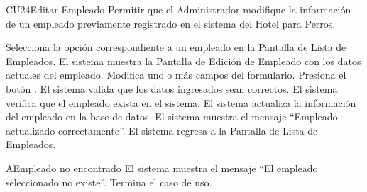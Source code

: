 
\begin{UseCase}{CU24}{Editar Empleado}{
	Permitir que el Administrador modifique la información de un empleado previamente registrado en el sistema del Hotel para Perros.
}
\end{UseCase}

\begin{UCtrayectoria}
	\UCpaso[\UCactor] Selecciona la opción  correspondiente a un empleado en la Pantalla de Lista de Empleados.
	\UCpaso El sistema muestra la Pantalla de Edición de Empleado con los datos actuales del empleado.
	\UCpaso[\UCactor] Modifica uno o más campos del formulario.
	\UCpaso[\UCactor] Presiona el botón .
	\UCpaso El sistema valida que los datos ingresados sean correctos.
	\UCpaso El sistema verifica que el empleado exista en el sistema.
	\UCpaso El sistema actualiza la información del empleado en la base de datos.
	\UCpaso El sistema muestra el mensaje ``Empleado actualizado correctamente''.
	\UCpaso El sistema regresa a la Pantalla de Lista de Empleados.
\end{UCtrayectoria}

\begin{UCtrayectoriaA}{A}{Empleado no encontrado}
	\UCpaso El sistema muestra el mensaje ``El empleado seleccionado no existe''.
	\UCpaso Termina el caso de uso.
\end{UCtrayectoriaA}

